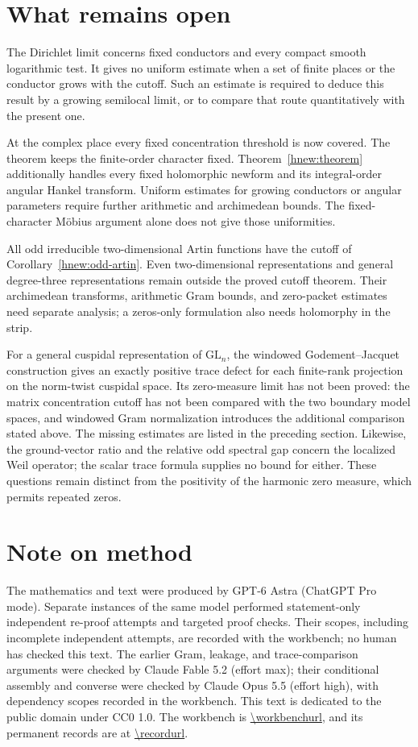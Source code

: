 \section{What remains open}
The Dirichlet limit concerns fixed conductors and every compact
smooth logarithmic test. It gives no uniform estimate when a set of
finite places or the conductor grows with the cutoff. Such an
estimate is required to deduce this result by a growing semilocal
limit, or to compare that route quantitatively with the present one.

At the complex place every fixed concentration threshold is now covered.
The theorem keeps the finite-order character fixed.
Theorem~\ref{hnew:theorem} additionally handles every fixed
holomorphic newform and its integral-order angular Hankel transform.
Uniform estimates for growing conductors or angular parameters
require further arithmetic and archimedean bounds. The fixed-character
M\"obius argument alone does not give those uniformities.

All odd irreducible two-dimensional Artin functions have the
cutoff of Corollary~\ref{hnew:odd-artin}. Even two-dimensional
representations and general degree-three representations remain
outside the proved cutoff theorem. Their archimedean transforms,
arithmetic Gram bounds, and zero-packet estimates need separate
analysis; a zeros-only formulation also needs holomorphy in the strip.

For a general cuspidal representation of $\mathrm{GL}_n$, the
windowed Godement--Jacquet construction gives an exactly positive
trace defect for each finite-rank projection on the norm-twist cuspidal
space. Its zero-measure
limit has not been proved: the matrix concentration cutoff has not
been compared with the two boundary model spaces, and windowed Gram
normalization introduces the additional comparison stated above.
The missing estimates are listed in the preceding section. Likewise,
the ground-vector ratio and the relative odd spectral gap concern
the localized Weil operator; the scalar trace formula supplies no
bound for either. These questions remain distinct from the positivity
of the harmonic zero measure, which permits repeated zeros.

\section*{Note on method}
The mathematics and text were produced by GPT-6 Astra (ChatGPT Pro
mode). Separate instances of the same model performed statement-only
independent re-proof attempts and targeted proof checks. Their scopes,
including incomplete independent attempts, are recorded with the
workbench; no human has checked this text. The earlier Gram, leakage, and trace-comparison arguments were checked
by Claude Fable 5.2 (effort max); their conditional assembly and converse
were checked by Claude Opus 5.5 (effort high), with dependency scopes
recorded in the workbench.
This text is dedicated to the public domain under CC0 1.0.
The workbench is \url{\workbenchurl}, and its permanent records are
at \url{\recordurl}.
